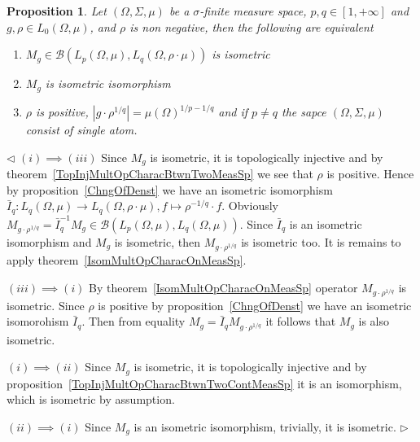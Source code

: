 \documentclass[12pt]{article}
\newtheorem{proposition}[theorem]{Proposition}
\newenvironment{proof}{\par $\triangleleft$}{$\triangleright$}
\begin{document}
\begin{proposition}\label{IsomMultOpCharacBtwnTwoContMeasSp}
    Let $(\Omega,\Sigma,\mu)$ be a $\sigma$-finite measure space,
    $p,q\in[1,+\infty]$ and $g,\rho\in L_0(\Omega,\mu)$, and $\rho$ is non
    negative, then the following are equivalent
    \begin{enumerate}[label = (\roman*)]
        \item $M_g\in\mathcal{B}(L_p(\Omega,\mu), L_q(\Omega,\rho\cdot\mu))$
              is isometric

        \item $M_g$ is isometric isomorphism

        \item $\rho$ is positive, $|g\cdot \rho^{1/q}|={\mu(\Omega)}^{1/p-1/q}$
              and if $p\neq q$ the sapce $(\Omega,\Sigma,\mu)$ 
              consist of single atom.
    \end{enumerate}
\end{proposition}
\begin{proof} $(i)\implies (iii)$ Since $M_g$ is isometric, it is topologically
    injective and by theorem~\ref{TopInjMultOpCharacBtwnTwoMeasSp} we see that
    $\rho$ is positive. Hence by proposition~\ref{ChngOfDenst} we have an
    isometric isomorphism
    $\bar{I}_q:L_q(\Omega,\mu)\to L_q(\Omega,\rho\cdot\mu),
        f\mapsto \rho^{-1/q}\cdot f$. Obviously
    $M_{g\cdot\rho^{1/q}}
        =\bar{I}_q^{-1} M_g\in\mathcal{B}(L_p(\Omega,\mu),L_q(\Omega,\mu))$. 
    Since $\bar{I}_q$ is an isometric isomorphism and $M_g$ is isometric, then
    $M_{g\cdot \rho^{1/q}}$ is isometric too. It is remains to apply
    theorem~\ref{IsomMultOpCharacOnMeasSp}.

    $(iii)\implies (i)$ By theorem~\ref{IsomMultOpCharacOnMeasSp} operator
    $M_{g\cdot\rho^{1/q}}$ is isometric. Since $\rho$ is positive by
    proposition~\ref{ChngOfDenst} we have an isometric isomorohism $\bar{I}_q$.
    Then from equality $M_g=\bar{I}_q M_{g\cdot\rho^{1/q}}$ it follows
    that $M_g$ is also isometric.

    $(i)\implies (ii)$ Since $M_g$ is isometric, it is topologically
    injective and by proposition~\ref{TopInjMultOpCharacBtwnTwoContMeasSp} it
    is an isomorphism, which is isometric by assumption.

    $(ii)\implies (i)$ Since $M_g$ is an isometric isomorphism, trivially,
    it is isometric.
\end{proof}
\end{document}
